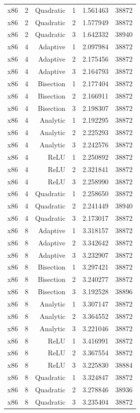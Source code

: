 {\begin{longtable}{lrrrrr}
x86 & 2 & Quadratic & 1 & 1.561463 & 38872 \\
x86 & 2 & Quadratic & 2 & 1.577949 & 38872 \\
x86 & 2 & Quadratic & 3 & 1.642332 & 38940 \\
x86 & 4 & Adaptive & 1 & 2.097984 & 38872 \\
x86 & 4 & Adaptive & 2 & 2.175456 & 38872 \\
x86 & 4 & Adaptive & 3 & 2.164793 & 38872 \\
x86 & 4 & Bisection & 1 & 2.177404 & 38872 \\
x86 & 4 & Bisection & 2 & 2.166911 & 38872 \\
x86 & 4 & Bisection & 3 & 2.198307 & 38872 \\
x86 & 4 & Analytic & 1 & 2.192295 & 38872 \\
x86 & 4 & Analytic & 2 & 2.225293 & 38872 \\
x86 & 4 & Analytic & 3 & 2.242576 & 38872 \\
x86 & 4 & ReLU & 1 & 2.250892 & 38872 \\
x86 & 4 & ReLU & 2 & 2.321841 & 38872 \\
x86 & 4 & ReLU & 3 & 2.258990 & 38872 \\
x86 & 4 & Quadratic & 1 & 2.258650 & 38872 \\
x86 & 4 & Quadratic & 2 & 2.241449 & 38940 \\
x86 & 4 & Quadratic & 3 & 2.173017 & 38872 \\
x86 & 8 & Adaptive & 1 & 3.318157 & 38872 \\
x86 & 8 & Adaptive & 2 & 3.342642 & 38872 \\
x86 & 8 & Adaptive & 3 & 3.232907 & 38872 \\
x86 & 8 & Bisection & 1 & 3.297421 & 38872 \\
x86 & 8 & Bisection & 2 & 3.240277 & 38872 \\
x86 & 8 & Bisection & 3 & 3.192528 & 38896 \\
x86 & 8 & Analytic & 1 & 3.307147 & 38872 \\
x86 & 8 & Analytic & 2 & 3.364552 & 38872 \\
x86 & 8 & Analytic & 3 & 3.221046 & 38872 \\
x86 & 8 & ReLU & 1 & 3.416991 & 38872 \\
x86 & 8 & ReLU & 2 & 3.367554 & 38872 \\
x86 & 8 & ReLU & 3 & 3.225830 & 38884 \\
x86 & 8 & Quadratic & 1 & 3.324847 & 38872 \\
x86 & 8 & Quadratic & 2 & 3.278846 & 38936 \\
x86 & 8 & Quadratic & 3 & 3.235404 & 38872 \\
\hline
\end{longtable}}
